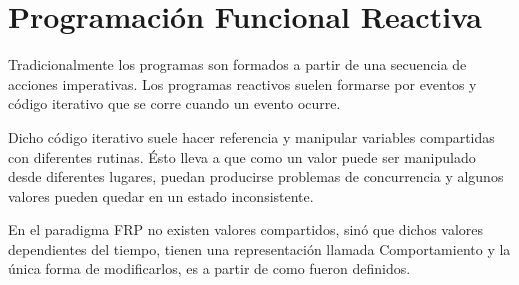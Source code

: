 



\section{Programación Funcional Reactiva}

Tradicionalmente los programas son formados a partir de
una secuencia de acciones imperativas. Los programas
reactivos suelen formarse por eventos y código iterativo
que se corre cuando un evento ocurre.

Dicho código iterativo suele hacer referencia y manipular
variables compartidas con diferentes rutinas. Ésto lleva a que
como un valor puede ser manipulado desde diferentes lugares,
puedan producirse problemas de concurrencia y algunos valores
pueden quedar en un estado inconsistente.

En el paradigma FRP no existen valores compartidos, sinó que
dichos valores dependientes del tiempo, tienen una representación
llamada Comportamiento y la única forma de modificarlos, es
a partir de como fueron definidos.

